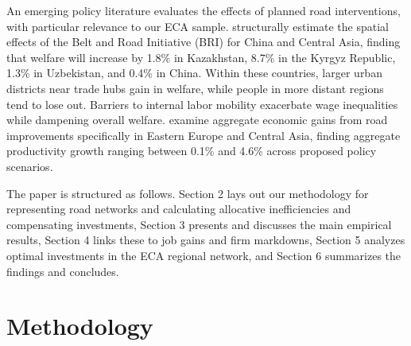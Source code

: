 \documentclass[a4paper]{article}
\begin{document}
An emerging policy literature evaluates the effects of planned road interventions, with particular relevance to our ECA sample. \citet{lallleband2020} structurally estimate the spatial effects of the Belt and Road Initiative (BRI) for China and Central Asia, finding that welfare will increase by 1.8\% in Kazakhstan, 8.7\% in the Kyrgyz Republic, 1.3\% in Uzbekistan, and 0.4\% in China. Within these countries, larger urban districts near trade hubs gain in welfare, while people in more distant regions tend to lose out. Barriers to internal labor mobility exacerbate wage inequalities while dampening overall welfare. \citet{cockriel2025aggregate} examine aggregate economic gains from road improvements specifically in Eastern Europe and Central Asia, finding aggregate productivity growth ranging between 0.1\% and 4.6\% across proposed policy scenarios. \newline


The paper is structured as follows. Section 2 lays out our methodology for representing road networks and calculating allocative inefficiencies and compensating investments, Section 3 presents and discusses the main empirical results, Section 4 links these to job gains and firm markdowns, Section 5 analyzes optimal investments in the ECA regional network, and Section 6 summarizes the findings and concludes. %


\section{Methodology} 
\end{document}
